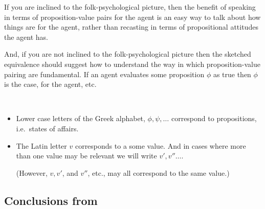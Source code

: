 \begin{note}
  If you are inclined to the folk-psychological picture, then the benefit of speaking in terms of proposition-value pairs for the agent is an easy way to talk about how things are for the agent, rather than recasting in terms of propositional attitudes the agent has.

  And, if you are not inclined to the folk-psychological picture then the sketched equivalence should suggest how to understand the way in which proposition-value pairing are fundamental.
  If an agent evaluates some proposition \(\phi\) as true then \(\phi\) is the case, for the agent, etc.
\end{note}

\begin{note}
  \begin{notation}
    \mbox{ }
    \vspace{-\baselineskip}
    \begin{itemize}
    \item
      Lower case letters of the Greek alphabet, \(\phi, \psi, \dots\) correspond to propositions, i.e.\ states of affairs.
    \item
      The Latin letter \(v\) corresponds to a some value.
      And in cases where more than one value may be relevant we will write \(v', v'' \dots\).

      (However, \(v, v'\), and \(v''\), etc., may all correspond to the same value.)
    \end{itemize}
    \vspace{-\baselineskip}
  \end{notation}
\end{note}



\subsection{Conclusions from }
\label{sec:pools-premises}

